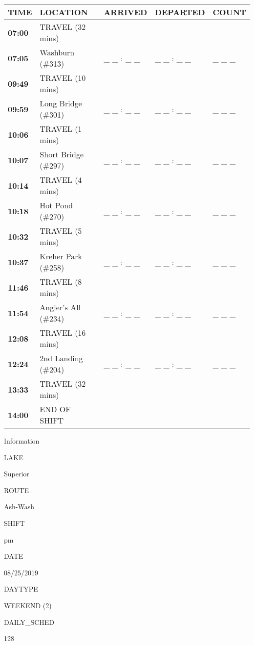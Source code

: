 \documentclass[]{article}
\begin{document}
\begin{tabular}{>{\bfseries}lllll}
\toprule
\textbf{TIME} & \textbf{LOCATION} & \textbf{ARRIVED} & \textbf{DEPARTED} & \textbf{COUNT}\\
\midrule
07:00 & TRAVEL (32 mins) &  &  & \\
07:05 & Washburn (\#313) & \_ \_ : \_ \_ & \_ \_ : \_ \_ & \_ \_ \_\\
09:49 & TRAVEL (10 mins) &  &  & \\
09:59 & Long Bridge (\#301) & \_ \_ : \_ \_ & \_ \_ : \_ \_ & \_ \_ \_\\
10:06 & TRAVEL (1 mins) &  &  & \\
10:07 & Short Bridge (\#297) & \_ \_ : \_ \_ & \_ \_ : \_ \_ & \_ \_ \_\\
10:14 & TRAVEL (4 mins) &  &  & \\
10:18 & Hot Pond (\#270) & \_ \_ : \_ \_ & \_ \_ : \_ \_ & \_ \_ \_\\
10:32 & TRAVEL (5 mins) &  &  & \\
10:37 & Kreher Park (\#258) & \_ \_ : \_ \_ & \_ \_ : \_ \_ & \_ \_ \_\\
11:46 & TRAVEL (8 mins) &  &  & \\
11:54 & Angler's All (\#234) & \_ \_ : \_ \_ & \_ \_ : \_ \_ & \_ \_ \_\\
12:08 & TRAVEL (16 mins) &  &  & \\
12:24 & 2nd Landing (\#204) & \_ \_ : \_ \_ & \_ \_ : \_ \_ & \_ \_ \_\\
13:33 & TRAVEL (32 mins) &  &  & \\
14:00 & END OF SHIFT &  &  & \\
\bottomrule
\end{tabular}\newpage

Information

LAKE

Superior

ROUTE

Ash-Wash

SHIFT

pm

DATE

08/25/2019

DAYTYPE

WEEKEND (2)

DAILY\_SCHED

128

\vspace{24pt}
\end{document}
